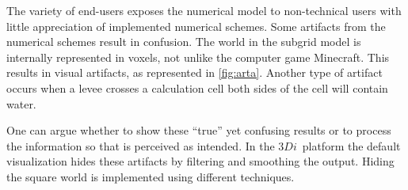 \documentclass[a4paper]{article}
\DeclareRobustCommand{\threedi}{$3Di$~}
\begin{document}
The variety of end-users exposes the numerical model to non-technical users with little appreciation of implemented numerical schemes. Some artifacts from the numerical schemes result in confusion. The world in the subgrid model is internally represented in voxels, not unlike the computer game Minecraft. This results in visual artifacts, as represented in \autoref{fig:arta}. Another type of artifact occurs when a levee crosses a calculation cell both sides of the cell will contain water.

One can argue whether to show these ``true'' yet confusing results or to process the information so that is perceived as intended. In the \threedi platform the default visualization hides these artifacts by filtering and smoothing the output. Hiding the square world is implemented using different techniques.
\end{document}
